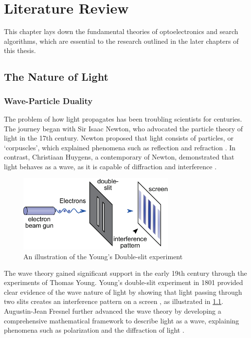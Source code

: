 \chapter{Literature Review} \label{sec:Literature Review}

\graphicspath{{Chapter2/Figs/}}
This chapter lays down the fundamental theories of optoelectronics and search algorithms, which are essential to the research outlined in the later chapters of this thesis.


\section{The Nature of Light}
\subsection{Wave-Particle Duality}
The problem of how light propagates has been troubling scientists for centuries. The journey began with Sir Isaac Newton, who advocated the particle theory of light in the 17th century. Newton proposed that light consists of particles, or `corpuscles', which explained phenomena such as reflection and refraction \cite{Newton1704}. In contrast, Christiaan Huygens, a contemporary of Newton, demonstrated that light behaves as a wave, as it is capable of diffraction and interference \cite{Huygens1690}.

\begin{figure}[H]
	\centering
	\includegraphics[width=0.7\textwidth]{Double-slit.eps}
	\caption{An illustration of the Young's Double-slit experiment \cite{Kalliauer2017}}
	\label{fig:Double-slit.eps}
\end{figure}

The wave theory gained significant support in the early 19th century through the experiments of Thomas Young. Young's double-slit experiment in 1801 provided clear evidence of the wave nature of light by showing that light passing through two slits creates an interference pattern on a screen \cite{Young1802}, as illustrated in \cref{fig:Double-slit.eps}. Augustin-Jean Fresnel further advanced the wave theory by developing a comprehensive mathematical framework to describe light as a wave, explaining phenomena such as polarization and the diffraction of light \cite{Fresnel1826}.

